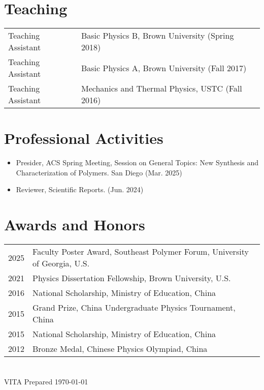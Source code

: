 \documentclass[11pt,letterpaper]{article}
\begin{document}
\section*{Teaching}
\vspace*{-0.15in}
\begin{longtable}{l p{\linewidth}}
    Teaching Assistant & Basic Physics B, Brown University (Spring 2018) \\
    Teaching Assistant & Basic Physics A, Brown University (Fall 2017) \\
    Teaching Assistant & Mechanics and Thermal Physics, USTC (Fall 2016)
\end{longtable}


\section*{Professional Activities}
\vspace*{-0.15in}
\begin{itemize}
    \item Presider, ACS Spring Meeting, Session on General Topics: New Synthesis and Characterization of Polymers. San Diego (Mar. 2025)
    \item Reviewer, Scientific Reports. (Jun. 2024)
\end{itemize}

\section*{Awards and Honors}
\vspace*{-0.15in}
\begin{longtable}{l p{\linewidth}}
    2025 & Faculty Poster Award, Southeast Polymer Forum, University of Georgia, U.S. \\
    2021 & Physics Dissertation Fellowship, Brown University, U.S.    \\
    2016 & National Scholarship, Ministry of Education, China         \\
    2015 & Grand Prize, China Undergraduate Physics Tournament, China \\
    2015 & National Scholarship, Ministry of Education, China         \\
    2012 & Bronze Medal, Chinese Physics Olympiad, China              \\
\end{longtable}

\section*{}
VITA Prepared \today
\end{document}
